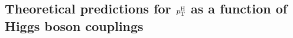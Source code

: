 \subsection{Theoretical predictions for \texorpdfstring{$p_\mathrm{T}^\mathrm{H}$}{pTH} as a function of Higgs boson couplings}







